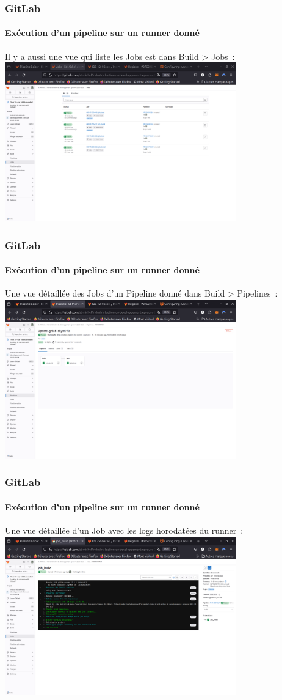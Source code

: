 \documentclass{beamer}
\begin{document}
    \begin{frame}
        \frametitle{GitLab}
        \framesubtitle{Exécution d'un pipeline sur un runner donné}
        \transdissolve
        Il y a aussi une vue qui liste les Jobs est dans Build > Jobs~:
        \bigbreak
        \centering
        \includegraphics[width=10cm]{image/gitlab-jobs-executions}
    \end{frame}

    \begin{frame}
        \frametitle{GitLab}
        \framesubtitle{Exécution d'un pipeline sur un runner donné}
        \transdissolve
        Une vue détaillée des Jobs d'un Pipeline donné dans Build > Pipelines~:
        \bigbreak
        \centering
        \includegraphics[width=10cm]{image/gitlab-pipeline-jobs-executions}
    \end{frame}

    \begin{frame}
        \frametitle{GitLab}
        \framesubtitle{Exécution d'un pipeline sur un runner donné}
        \transdissolve
        Une vue détaillée d'un Job avec les logs horodatées du runner~:
        \bigbreak
        \centering
        \includegraphics[width=10cm]{image/gitlab-pipeline-job-details}
    \end{frame}
\end{document}
